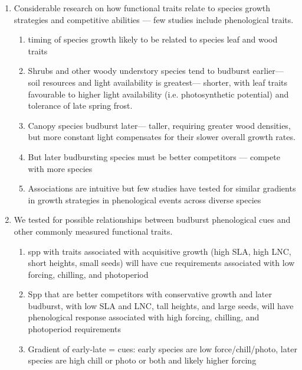 \documentclass{article}
\begin{document}
\begin{enumerate}
\item Considerable research on how functional traits relate to species growth strategies and competitive abilities — few studies include phenological traits. %
\begin{enumerate}
\item timing of species growth likely to be related to species leaf and wood traits 
\item Shrubs and other woody understory species tend to budburst earlier--- soil resources and light availability is greatest--- shorter, with leaf traits favourable to higher light availability (i.e. photosynthetic potential) and tolerance of late spring frost.
\item Canopy species budburst later--- taller, requiring greater wood densities, but more constant light compensates for their slower overall growth rates.
\item But later budbursting species must be better competitors --- compete with more species
\item Associations are intuitive but few studies have tested for similar gradients in growth strategies in phenological events across diverse species
\end{enumerate}

\item We tested for possible relationships between budburst phenological cues and other commonly measured functional traits. %
\begin{enumerate}
\item spp with traits associated with acquisitive growth (high SLA, high LNC, short heights, small seeds) will have cue requirements associated with low forcing, chilling, and photoperiod %
\item Spp that are better competitors with conservative growth and later budburst, with low SLA and LNC, tall heights, and large seeds, will have phenological response associated with high forcing, chilling, and photoperiod requirements %
\item Gradient of early-late = cues: early species are low force/chill/photo, later species are high chill or photo or both and likely higher forcing %
\end{enumerate}


\end{enumerate}
\end{document}
